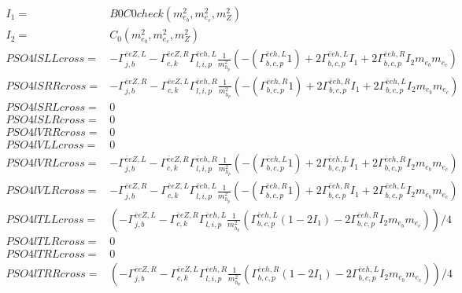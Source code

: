 \documentclass[A4,landscape]{article}
\begin{document}
\begin{align} 
I_1= & B0C0check(m^2_{e_{{b}}}, m^2_{e_{{c}}}, m^2_{Z}) \\ 
I_2= & C_0(m^2_{e_{{b}}}, m^2_{e_{{c}}}, m^2_{Z}) \\ 
  PSO4lSLLcross= &  - \Gamma^{\bar{e}e Z ,L} _{j, b} - \Gamma^{\bar{e}e Z ,R} _{c, k} \Gamma^{\bar{e}e h ,L}_{l, i, p} \frac{1}{m^2_{h_{{p}}}} (-(\Gamma^{\bar{e}e h ,L}_{b, c, p} 1) + 2 \Gamma^{\bar{e}e h ,L}_{b, c, p} I_1 + 2 \Gamma^{\bar{e}e h ,R}_{b, c, p} I_2 m_{e_{{b}}} m_{e_{{c}}}) \\ 
  PSO4lSRRcross= &  - \Gamma^{\bar{e}e Z ,R} _{j, b} - \Gamma^{\bar{e}e Z ,L} _{c, k} \Gamma^{\bar{e}e h ,R}_{l, i, p} \frac{1}{m^2_{h_{{p}}}} (-(\Gamma^{\bar{e}e h ,R}_{b, c, p} 1) + 2 \Gamma^{\bar{e}e h ,R}_{b, c, p} I_1 + 2 \Gamma^{\bar{e}e h ,L}_{b, c, p} I_2 m_{e_{{b}}} m_{e_{{c}}}) \\ 
  PSO4lSRLcross= & 0 \\ 
  PSO4lSLRcross= & 0 \\ 
  PSO4lVRRcross= & 0 \\ 
  PSO4lVLLcross= & 0 \\ 
  PSO4lVRLcross= &  - \Gamma^{\bar{e}e Z ,L} _{j, b} - \Gamma^{\bar{e}e Z ,R} _{c, k} \Gamma^{\bar{e}e h ,R}_{l, i, p} \frac{1}{m^2_{h_{{p}}}} (-(\Gamma^{\bar{e}e h ,L}_{b, c, p} 1) + 2 \Gamma^{\bar{e}e h ,L}_{b, c, p} I_1 + 2 \Gamma^{\bar{e}e h ,R}_{b, c, p} I_2 m_{e_{{b}}} m_{e_{{c}}}) \\ 
  PSO4lVLRcross= &  - \Gamma^{\bar{e}e Z ,R} _{j, b} - \Gamma^{\bar{e}e Z ,L} _{c, k} \Gamma^{\bar{e}e h ,L}_{l, i, p} \frac{1}{m^2_{h_{{p}}}} (-(\Gamma^{\bar{e}e h ,R}_{b, c, p} 1) + 2 \Gamma^{\bar{e}e h ,R}_{b, c, p} I_1 + 2 \Gamma^{\bar{e}e h ,L}_{b, c, p} I_2 m_{e_{{b}}} m_{e_{{c}}}) \\ 
  PSO4lTLLcross= & ( - \Gamma^{\bar{e}e Z ,L} _{j, b} - \Gamma^{\bar{e}e Z ,R} _{c, k} \Gamma^{\bar{e}e h ,L}_{l, i, p} \frac{1}{m^2_{h_{{p}}}} (\Gamma^{\bar{e}e h ,L}_{b, c, p} (1 - 2 I_1) - 2 \Gamma^{\bar{e}e h ,R}_{b, c, p} I_2 m_{e_{{b}}} m_{e_{{c}}}))/4 \\ 
  PSO4lTLRcross= & 0 \\ 
  PSO4lTRLcross= & 0 \\ 
  PSO4lTRRcross= & ( - \Gamma^{\bar{e}e Z ,R} _{j, b} - \Gamma^{\bar{e}e Z ,L} _{c, k} \Gamma^{\bar{e}e h ,R}_{l, i, p} \frac{1}{m^2_{h_{{p}}}} (\Gamma^{\bar{e}e h ,R}_{b, c, p} (1 - 2 I_1) - 2 \Gamma^{\bar{e}e h ,L}_{b, c, p} I_2 m_{e_{{b}}} m_{e_{{c}}}))/4 \\ 
\end{align} 
\end{document}
